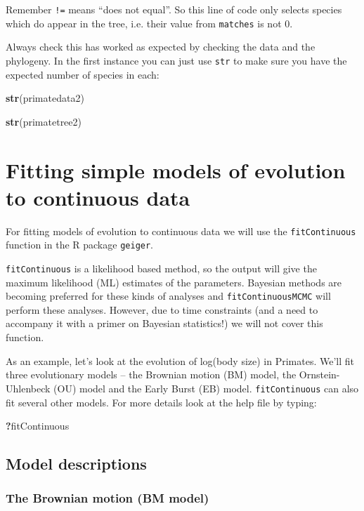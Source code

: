 \documentclass[11pt]{article}
\newcommand{\KeywordTok}[1]{\textcolor[rgb]{0.13,0.29,0.53}{\textbf{{#1}}}}
\newcommand{\NormalTok}[1]{{#1}}
\begin{document}
Remember \texttt{!=} means ``does not equal''. So this line of code only selects species which do appear in the tree, i.e. their value from \texttt{matches} is not 0. 

Always check this has worked as expected by checking the data and the phylogeny. In the first instance you can just use \texttt{str} to make sure you have the expected number of species in each:

\begin{snugshade}
\begin{Highlighting}[]
\KeywordTok{str}\NormalTok{(primatedata2)}

\KeywordTok{str}\NormalTok{(primatetree2)}
\end{Highlighting}
\end{snugshade}

\section{Fitting simple models of evolution to continuous data}
\label{models}
For fitting models of evolution to continuous data we will use the \texttt{fitContinuous} function in the R package \texttt{geiger}.

\texttt{fitContinuous} is a likelihood based method, so the output will give the maximum likelihood (ML) estimates of the parameters. Bayesian methods are becoming preferred for these kinds of analyses and \texttt{fitContinuousMCMC} will perform these analyses. However, due to time constraints (and a need to accompany it with a primer on Bayesian statistics!) we will not cover this function.

As an example, let’s look at the evolution of log(body size) in Primates. We’ll fit three evolutionary models – the Brownian motion (BM) model, the Ornstein-Uhlenbeck (OU) model and the Early Burst (EB) model. \texttt{fitContinuous} can also fit several other models. For more details look at the help file by typing:

\begin{snugshade}
\begin{Highlighting}[]
\KeywordTok{?}\NormalTok{fitContinuous}
\end{Highlighting}
\end{snugshade}

\subsection{Model descriptions}
\subsubsection{The Brownian motion (BM model)}
\end{document}
